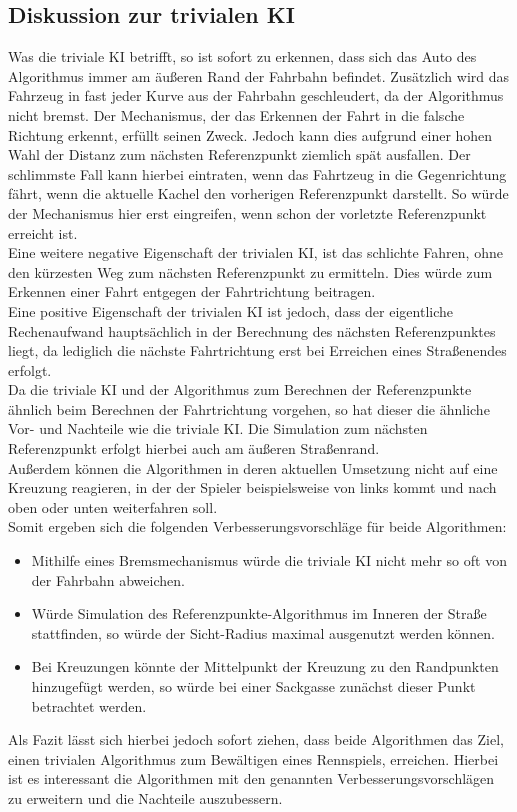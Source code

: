 \subsection{Diskussion zur trivialen KI}
Was die triviale KI betrifft, so ist sofort zu erkennen, dass sich das Auto des Algorithmus immer am äußeren Rand der Fahrbahn befindet. Zusätzlich wird das Fahrzeug in fast jeder Kurve aus der Fahrbahn geschleudert, da der Algorithmus nicht bremst. Der Mechanismus, der das Erkennen der Fahrt in die falsche Richtung erkennt, erfüllt seinen Zweck. Jedoch kann dies aufgrund einer hohen Wahl der Distanz zum nächsten Referenzpunkt ziemlich spät ausfallen. Der schlimmste Fall kann hierbei eintraten, wenn das Fahrtzeug in die Gegenrichtung fährt, wenn die aktuelle Kachel den vorherigen Referenzpunkt darstellt. So würde der Mechanismus hier erst eingreifen, wenn schon der vorletzte Referenzpunkt erreicht ist.\\
Eine weitere negative Eigenschaft der trivialen KI, ist das schlichte Fahren, ohne den kürzesten Weg zum nächsten Referenzpunkt zu ermitteln. Dies würde zum Erkennen einer Fahrt entgegen der Fahrtrichtung beitragen.\\
Eine positive Eigenschaft der trivialen KI ist jedoch, dass der eigentliche Rechenaufwand hauptsächlich in der Berechnung des nächsten Referenzpunktes liegt, da lediglich die nächste Fahrtrichtung erst bei Erreichen eines Straßenendes erfolgt.\\
Da die triviale KI und der Algorithmus zum Berechnen der Referenzpunkte ähnlich beim Berechnen der Fahrtrichtung vorgehen, so hat dieser die ähnliche Vor- und Nachteile wie die triviale KI. Die Simulation zum nächsten Referenzpunkt erfolgt hierbei auch am äußeren Straßenrand.\\
Außerdem können die Algorithmen in deren aktuellen Umsetzung nicht auf eine Kreuzung reagieren, in der der Spieler beispielsweise von links kommt und nach oben oder unten weiterfahren soll.\\ 
Somit ergeben sich die folgenden Verbesserungsvorschläge für beide Algorithmen:
\begin{itemize}
\item Mithilfe eines Bremsmechanismus würde die triviale KI nicht mehr so oft von der Fahrbahn abweichen.
\item Würde Simulation des Referenzpunkte-Algorithmus im Inneren der Straße stattfinden, so würde der Sicht-Radius maximal ausgenutzt werden können. 
\item Bei Kreuzungen könnte der Mittelpunkt der Kreuzung zu den Randpunkten hinzugefügt werden, so würde bei einer Sackgasse zunächst dieser Punkt betrachtet werden.
\end{itemize}
Als Fazit lässt sich hierbei jedoch sofort ziehen, dass beide Algorithmen das Ziel, einen trivialen Algorithmus zum Bewältigen eines Rennspiels, erreichen. Hierbei ist es interessant die Algorithmen mit den genannten Verbesserungsvorschlägen zu erweitern und die Nachteile auszubessern.   